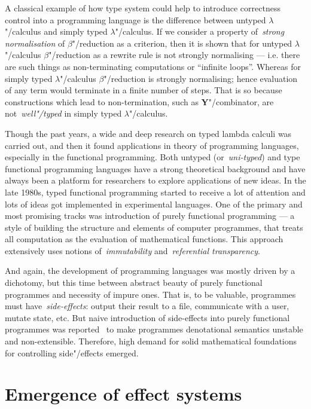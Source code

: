 A classical example of how type system could help to introduce correctness control into
a programming language is the difference between untyped $\lambda$"/calculus and simply
typed $\lambda$"/calculus. If we consider a property of~\emph{strong normalisation}
of $\beta$"/reduction as a criterion, then it is shown that for untyped $\lambda$"/calculus
$\beta$"/reduction as a rewrite rule is not strongly normalising --- i.e. there are
such things as non-terminating computations or ``infinite loops''. Whereas
for simply typed $\lambda$"/calculus $\beta$"/reduction is strongly normalising;
hence evaluation of any term would terminate in a finite number of steps. That is so
because constructions which lead to non-termination, such as \textbf{Y}"/combinator,
are not~\emph{well"/typed} in simply typed $\lambda$"/calculus.

Though the past years, a wide and deep research on typed lambda calculi was carried out,
and then it found applications in theory of programming languages, especially in the
functional programming. Both untyped (or~\emph{uni-typed}) and type functional programming
languages have a strong theoretical background and have always been a platform for
researchers to explore applications of new ideas. In the late 1980s, typed functional programming
started to receive a lot of attention and lots of ideas got implemented in experimental
languages. One of the primary and most promising tracks was introduction of purely
functional programming --- a style of building the structure and elements of computer
programmes, that treats all computation as the evaluation of mathematical functions. This
approach extensively uses notions of~\emph{immutability} and~\emph{referential transparency}.

And again, the development of programming languages was mostly driven by a dichotomy, but
this time between abstract beauty of purely functional programmes and necessity of impure ones.
That is, to be valuable, programmes must have~\emph{side-effects}: output their result to a file,
communicate with a user, mutate state, etc. But naive introduction of side-effects into
purely functional programmes was reported~\cite{Cartwright1994} to make
programmes denotational semantics unstable and non-extensible. Therefore, high demand for
solid mathematical foundations for controlling side"/effects emerged.

\section{Emergence of effect systems}

